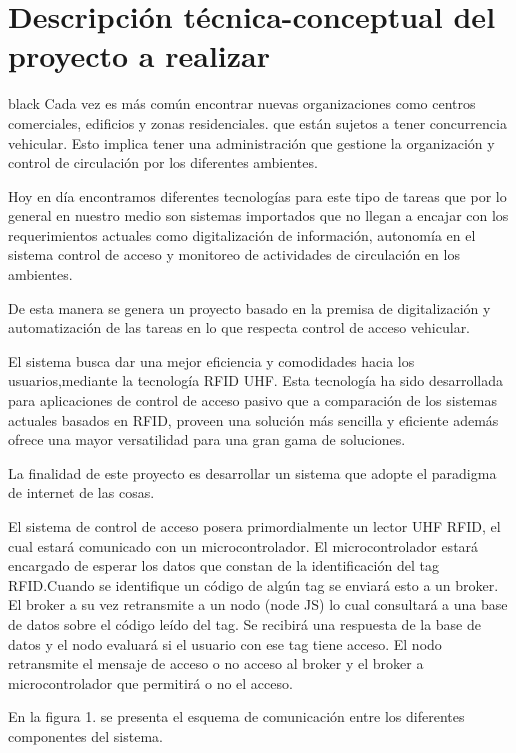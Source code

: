 \documentclass[
11pt, %
codirector, %
]{charter}
\begin{document}
\section{Descripción técnica-conceptual del proyecto a realizar}
\label{sec:descripcion}
\begin{consigna}{black} %
Cada vez es más común encontrar nuevas organizaciones como centros comerciales, edificios y zonas residenciales. que están sujetos a tener concurrencia vehicular. Esto implica tener una administración que gestione la organización y control de circulación por los diferentes ambientes. 

Hoy en día encontramos diferentes tecnologías para este tipo de tareas que por lo general en nuestro medio son sistemas  importados que no llegan a encajar con los requerimientos actuales como digitalización de información, autonomía en el sistema control de acceso y  monitoreo de actividades de circulación en los ambientes.

De esta manera se genera un proyecto basado en la premisa de digitalización y automatización de las tareas en lo que respecta control de acceso vehicular.
 
El sistema busca dar una mejor eficiencia y comodidades hacia los usuarios,mediante la tecnología RFID UHF. Esta tecnología ha sido desarrollada para aplicaciones de control de acceso pasivo que a comparación de los sistemas actuales  basados en RFID, proveen una solución más sencilla y eficiente además ofrece una mayor versatilidad para una gran gama de soluciones.


La finalidad de este proyecto es desarrollar un sistema que adopte el paradigma de internet de las cosas.

El sistema de control de acceso posera primordialmente un lector UHF RFID, el cual estará comunicado con un microcontrolador. El microcontrolador estará encargado de esperar los datos que constan de la identificación del tag RFID.Cuando se identifique un código de algún tag  se enviará esto a un broker. El broker a su vez retransmite a un nodo (node JS) lo cual  consultará a una base de datos sobre el código leído del tag. Se recibirá una respuesta de la base de datos y el nodo evaluará si el usuario con ese tag tiene acceso. El nodo retransmite el mensaje de acceso o no acceso al broker y el broker a microcontrolador que permitirá o no  el acceso.

En la figura 1. se presenta el esquema de comunicación entre los diferentes componentes del sistema.


\end{consigna}
\end{document}
